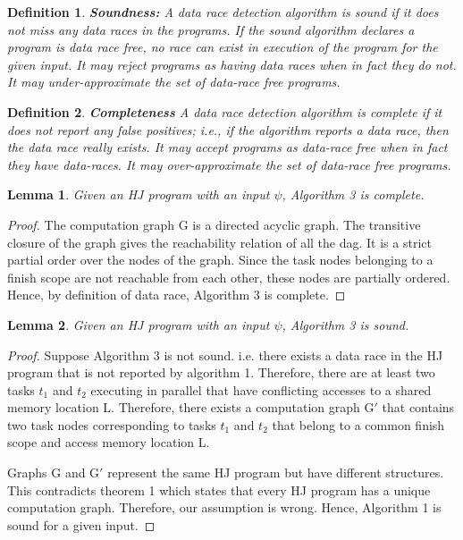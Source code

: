 \documentclass[10pt]{article}
\newcommand{\lineref}[1]{Line~\ref{#1}}
\newtheorem{definition}{Definition}
\newtheorem{lemma}{Lemma}
\begin{document}
\begin{definition} 
\textbf{Soundness:}
A data race detection algorithm is sound if it does not miss any data races in the programs. If the sound algorithm declares a program is data race free, no race can exist in execution of the program for the given input. It may reject programs as having data races when in fact they do not. It may under-approximate the set of data-race free programs.
\end{definition}

\begin{definition}
\textbf{Completeness}
A data race detection algorithm is complete if it does not report any false positives; i.e., if the algorithm reports a data race, then the data race really exists. It may accept programs as data-race free when in fact they have data-races. It may over-approximate the set of data-race free programs.
\end{definition}

\begin{lemma}
Given an HJ program with an input $\psi$, Algorithm 3 is complete.
\end{lemma}
\begin{proof}
The computation graph G is a directed acyclic graph. The transitive closure of the graph gives the reachability relation of all the dag. It is a strict partial order over the nodes of the graph. Since the task nodes belonging to a finish scope are not reachable from each other, these nodes are partially ordered. Hence, by definition of data race, Algorithm 3 is complete.
\end{proof}

\begin{lemma}
Given an HJ program with an input $\psi$, Algorithm 3 is sound.
\end{lemma}
\begin{proof}
Suppose Algorithm 3 is not sound. i.e. there exists a data race in the HJ program that is not reported by algorithm 1. Therefore, there are at least two tasks $t_1$ and $t_2$ executing in parallel that have conflicting accesses to a shared memory location L. Therefore, there exists a computation graph G$'$ that contains two task nodes corresponding to tasks $t_1$ and $t_2$ that belong to a common finish scope and access memory location L. 

Graphs G and G$'$ represent the same HJ program but have different structures. This contradicts theorem 1 which states that every HJ program has a unique computation graph. Therefore, our assumption is wrong. Hence, Algorithm 1 is sound for a given input.
\end{proof}
\end{document}
